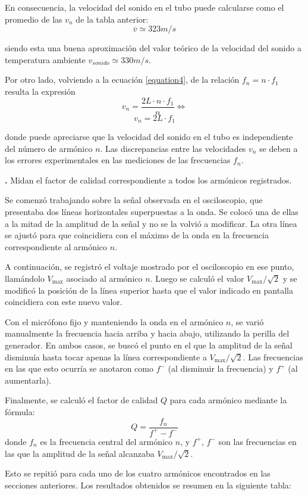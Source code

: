 \documentclass[12pt, a4paper]{article}
\newcounter{step}
\newcommand{\step}[1]
{
  \par\vspace{2ex}
  \stepcounter{step}
  \noindent\textbf{\arabic{step}.} #1\par\vspace{1ex}
}
\begin{document}
En consecuencia, la velocidad del sonido en el tubo puede calcularse como el promedio de las $v_{n}$ de la tabla anterior:
$$\overline{v} \simeq 323 m/s$$

siendo esta una buena aproximación del valor teórico de la velocidad del sonido a temperatura ambiente $v_{sonido}\simeq 330 m/s$.

Por otro lado, volviendo a la ecuación \ref{equation4}, de la relación $f_{n}=n\cdot f_{1}$ resulta la expresión
$$ v_{n} = \frac{2L \cdot n \cdot f_{1}}{n} \Longleftrightarrow $$
$$ v_{n} = 2L \cdot f_{1} $$

donde puede apreciarse que la velocidad del sonido en el tubo es independiente del número de armónico $n$. Las discrepancias entre las velocidades $v_{n}$ se deben a los errores experimentales en las mediciones de las frecuencias $f_{n}$.


\step{Midan el factor de calidad correspondiente a todos los armónicos registrados.}

Se comenzó trabajando sobre la señal observada en el osciloscopio, que presentaba dos líneas horizontales superpuestas a la onda. Se colocó una de ellas a la mitad de la amplitud de la señal y no se la  volvió a modificar. La otra línea se ajustó para que coincidiera con el máximo de la onda en la frecuencia correspondiente al armónico $n$.

A continuación, se registró el voltaje mostrado por el osciloscopio en ese punto, llamándolo $V_\mathrm{max}$ asociado al armónico $n$. Luego se calculó el valor $V_\mathrm{max}/\sqrt{2}$ y se modificó la posición de la línea superior hasta que el valor indicado en pantalla coincidiera con este nuevo valor.

Con el micrófono fijo y manteniendo la onda en el armónico $n$, se varió manualmente la frecuencia hacia arriba y hacia abajo, utilizando la perilla del generador. En ambos casos, se buscó el punto en el que la amplitud de la señal disminuía hasta tocar apenas la línea correspondiente a $V_\mathrm{max}/\sqrt{2}$. Las frecuencias en las que esto ocurría se anotaron como $f^-$ (al disminuir la frecuencia) y $f^+$ (al aumentarla).

Finalmente, se calculó el factor de calidad $Q$ para cada armónico mediante la fórmula:
$$Q = \frac{f_n}{f^+ - f^-}$$
donde $f_n$ es la frecuencia central del armónico $n$, y $f^+$, $f^-$ son las frecuencias en las que la amplitud de la señal alcanzaba $V_\mathrm{max}/\sqrt{2}$.

Esto se repitió para cada uno de los cuatro armónicos encontrados en las secciones anteriores. Los resultados obtenidos se resumen en la siguiente tabla:
\end{document}
